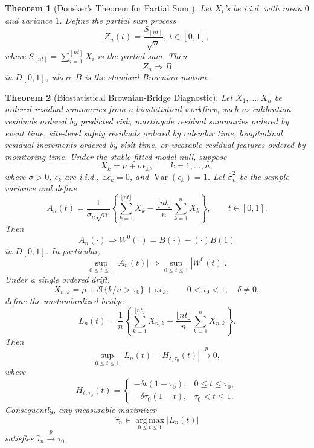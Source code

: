\documentclass{article}
\theoremstyle{plain}
\newtheorem{theorem}{Theorem}
\theoremstyle{definition}
\begin{document}
\begin{theorem}[Donsker's Theorem for Partial Sum \citep{donsker1952justification}]
Let $X_i$'s be i.i.d. with mean $0$ and variance $1$. Define the partial sum process 
\[
Z_n(t) = \frac{S_{[nt]}}{\sqrt{n}},\ t\in[0,1],
\]
where $S_{[nt]} = \sum_{i=1}^{[nt]}X_i$ is the partial sum. Then
\[
Z_n \Rightarrow B
\]
in $D[0,1]$, where $B$ is the standard Brownian motion.
\end{theorem}

\begin{theorem}[Biostatistical Brownian-Bridge Diagnostic]\label{thm:biostats-bridge}
Let $X_1,\ldots,X_n$ be ordered residual summaries from a biostatistical workflow, such as calibration residuals ordered by predicted risk, martingale residual summaries ordered by event time, site-level safety residuals ordered by calendar time, longitudinal residual increments ordered by visit time, or wearable residual features ordered by monitoring time. Under the stable fitted-model null, suppose
\[
X_k=\mu+\sigma\epsilon_k,\qquad k=1,\ldots,n,
\]
where $\sigma>0$, $\epsilon_k$ are i.i.d., $\mathbb{E}\epsilon_k=0$, and $\operatorname{Var}(\epsilon_k)=1$. Let $\widehat{\sigma}_n^2$ be the sample variance and define
\[
A_n(t)=\frac{1}{\widehat{\sigma}_n\sqrt n}
\left\{\sum_{k=1}^{\lfloor nt\rfloor}X_k
-\frac{\lfloor nt\rfloor}{n}\sum_{k=1}^{n}X_k\right\},\qquad t\in[0,1].
\]
Then
\[
A_n(\cdot)\Rightarrow W^0(\cdot)=B(\cdot)-(\cdot)B(1)
\]
in $D[0,1]$. In particular,
\[
\sup_{0\le t\le1}|A_n(t)|\Rightarrow \sup_{0\le t\le1}|W^0(t)|.
\]
Under a single ordered drift,
\[
X_{n,k}=\mu+\delta\mathbb{I}\{k/n>\tau_0\}+\sigma\epsilon_k,
\qquad 0<\tau_0<1,\quad \delta\ne0,
\]
define the unstandardized bridge
\[
L_n(t)=\frac{1}{n}
\left\{\sum_{k=1}^{\lfloor nt\rfloor}X_{n,k}
-\frac{\lfloor nt\rfloor}{n}\sum_{k=1}^{n}X_{n,k}\right\}.
\]
Then
\[
\sup_{0\le t\le1}|L_n(t)-H_{\delta,\tau_0}(t)|\xrightarrow{p}0,
\]
where
\[
H_{\delta,\tau_0}(t)=
\begin{cases}
-\delta t(1-\tau_0), & 0\le t\le\tau_0,\\
-\delta \tau_0(1-t), & \tau_0<t\le1.
\end{cases}
\]
Consequently, any measurable maximizer
\[
\widehat{\tau}_n\in\operatorname*{arg\,max}_{0\le t\le1}|L_n(t)|
\]
satisfies $\widehat{\tau}_n\xrightarrow{p}\tau_0$.
\end{theorem}
\end{document}
